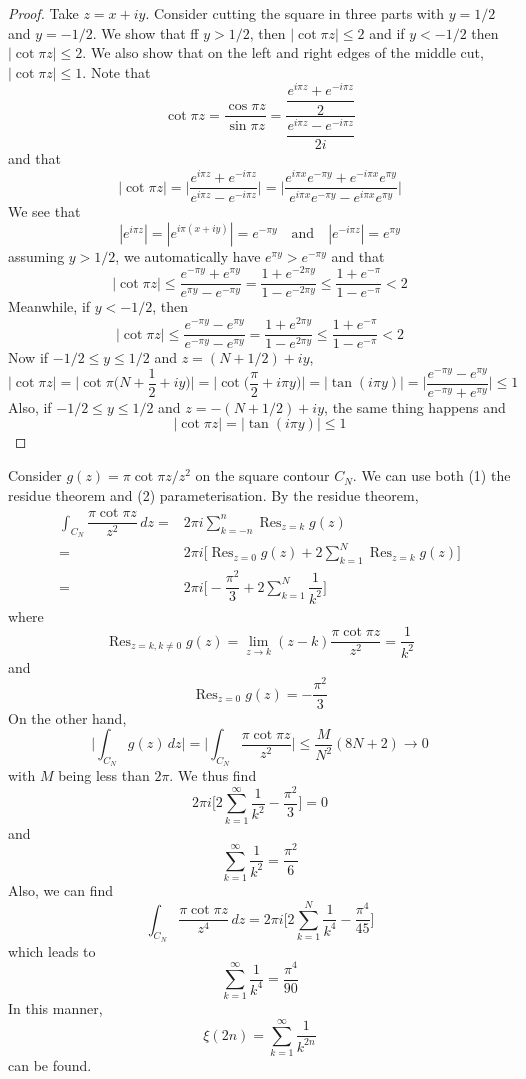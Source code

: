 \begin{proof}
Take $z=x+iy$. Consider cutting the square in three parts with $y=1/2$ and $y=-1/2$. We show that ff $y>1/2$, then $|\cot \pi z|\leq 2$ and if $y<-1/2$ then $|\cot \pi z|\leq 2$. We also show that on the left and right edges of the middle cut, $|\cot \pi z|\leq 1$. Note that
\[\cot \pi z=\dfrac{\cos \pi z}{\sin \pi z}=\dfrac{\dfrac{e^{i\pi z}+e^{-i\pi z}}{2}}{\dfrac{e^{i\pi z}-e^{-i\pi z}}{2i}}\]
and that 
\[|\cot \pi z|=\Big|\dfrac{e^{i\pi z}+e^{-i\pi z}}{e^{i\pi z}-e^{-i\pi z}}\Big|=\Big|\dfrac{e^{i\pi x}e^{-\pi y}+e^{-i\pi x}e^{\pi y}}{e^{i\pi x}e^{-\pi y}-e^{i\pi x}e^{\pi y}}\Big|\]
We see that
\[|e^{i\pi z}|=|e^{i\pi (x+iy)}|=e^{-\pi y}\quad \mathrm{and}\quad |e^{-i\pi z}|=e^{\pi y}\]
assuming $y>1/2$, we automatically have $e^{\pi y}>e^{-\pi y}$ and that
\[|\cot \pi z|\leq \dfrac{e^{-\pi y}+e^{\pi y}}{e^{\pi y}-e^{-\pi y}}=\dfrac{1+e^{-2\pi y}}{1-e^{-2\pi y}}\leq \dfrac{1+e^{-\pi }}{1-e^{-\pi }}<2\]
Meanwhile, if $y<-1/2$, then
\[|\cot \pi z|\leq \dfrac{e^{-\pi y}-e^{\pi y}}{e^{-\pi y}-e^{\pi y}}=\dfrac{1+e^{2\pi y}}{1-e^{2\pi y}}\leq \dfrac{1+e^{-\pi }}{1-e^{-\pi }}<2\]
Now if $-1/2\leq y\leq 1/2$ and $z=(N+1/2)+iy$,
\[|\cot \pi z|=\Big|\cot \pi \Big(N+\dfrac{1}{2}+iy\Big)\Big|=\Big|\cot\Big(\dfrac{\pi }{2}+i\pi y\Big)\Big|=|\tan (i\pi y)|=\Big|\dfrac{e^{-\pi y}-e^{\pi y}}{e^{-\pi y}+e^{\pi y}}\Big|\leq 1\]
Also, if $-1/2\leq y \leq 1/2$ and $z=-(N+1/2)+iy$, the same thing happens and 
\[|\cot\pi z|=|\tan (i\pi y)|\leq 1\]
\end{proof}
\vspace{2ex}
\begin{ex}
Consider $g(z)=\pi \cot \pi z/z^2$ on the square contour $C_{N}$. We can use both (1) the residue theorem and (2) parameterisation. By the residue theorem,
\begin{align*}
\int _{C_{N}}\dfrac{\pi \cot \pi z}{z^2 }\,dz=&2\pi i\sum _{k=-n}^{n}\mathop{\mathrm{Res}}_{z=k}g(z)\\
=&2\pi i\Big[\mathop{\mathrm{Res}}_{z=0}g(z)+2\sum ^{N}_{k=1}\mathop{\mathrm{Res}}_{z=k}g(z)\Big]\\
=&2\pi i\Big[-\dfrac{\pi ^2}{3}+2\sum ^{N}_{k=1}\dfrac{1}{k^2}\Big]
\end{align*}
where 
\[\mathop{\mathrm{Res}}_{z=k, k\ne 0}g(z)=\lim _{z\rightarrow k}(z-k)\dfrac{\pi \cot \pi z}{z^2}=\dfrac{1}{k^2}\]
and
\[\mathop{\mathrm{Res}}_{z=0}g(z)=-\dfrac{\pi ^2}{3}\]
On the other hand,
\[\Big|\int _{C_{N}}g(z)\,dz\Big|=\Big|\int _{C_{N}}\dfrac{\pi \cot \pi z}{z^2}\Big|\leq \dfrac{M}{N^2}(8N+2)\rightarrow 0\]
with $M$ being less than $2\pi $. We thus find 
\[2\pi i\Big[2\sum ^{\infty }_{k=1}\dfrac{1}{k^2}-\dfrac{\pi ^2}{3}\Big]=0\]
and
\[\sum ^{\infty }_{k=1}\dfrac{1}{k^2}=\dfrac{\pi ^2}{6}\]
Also, we can find
\[\int _{C_{N}}\dfrac{\pi \cot \pi z}{z^{4}}\,dz=2\pi i\Big[2\sum ^{N}_{k=1}\dfrac{1}{k^{4}}-\dfrac{\pi ^{4}}{45}\Big]\]
which leads to 
\[\sum ^{\infty }_{k=1}\dfrac{1}{k^{4}}=\dfrac{\pi ^{4}}{90}\]
In this manner,
\[\xi (2n)=\sum ^{\infty }_{k=1}\dfrac{1}{k^{2n}}\]
can be found. 
\end{ex}
